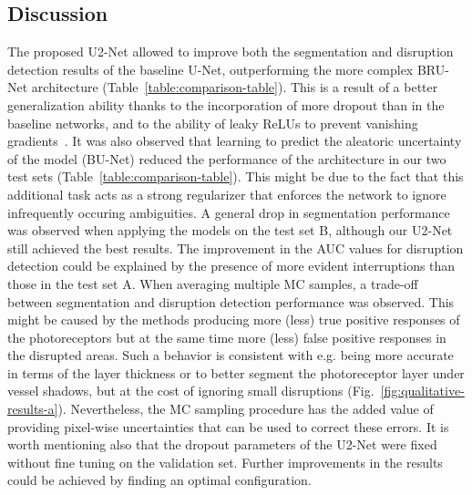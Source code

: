 \subsection{Discussion}

The proposed U2-Net allowed to improve both the segmentation and disruption detection results of the baseline U-Net, outperforming the more complex BRU-Net architecture (Table~\ref{table:comparison-table}). This is a result of a better generalization ability thanks to the incorporation of more dropout than in the baseline networks, and to the ability of leaky ReLUs to prevent vanishing gradients~\cite{xu2015empirical}. It was also observed that learning to predict the aleatoric uncertainty of the model (BU-Net) reduced the performance of the architecture in our two test sets (Table~\ref{table:comparison-table}). This might be due to the fact that this additional task acts as a strong regularizer that enforces the network to ignore infrequently occuring ambiguities. A general drop in segmentation performance was observed when applying the models on the test set B, although our U2-Net still achieved the best results. The improvement in the AUC values for disruption detection could be explained by the presence of more evident interruptions than those in the test set A. When averaging multiple MC samples, a trade-off between segmentation and disruption detection performance was observed. This might be caused by the methods producing more (less) true positive responses of the photoreceptors but at the same time more (less) false positive responses in the disrupted areas. Such a behavior is consistent with e.g. being more accurate in terms of the layer thickness or to better segment the photoreceptor layer under vessel shadows, but at the cost of ignoring small disruptions (Fig.~\ref{fig:qualitative-results-a}). Nevertheless, the MC sampling procedure has the added value of providing pixel-wise uncertainties that can be used to correct these errors. It is worth mentioning also that the dropout parameters of the U2-Net were fixed without fine tuning on the validation set. Further improvements in the results could be achieved by finding an optimal configuration.

